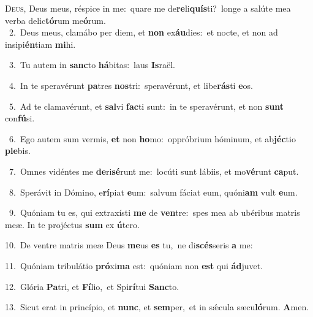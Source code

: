 \lettrine{\initial\textcolor{\initialcolor}{D}}{eus,} Deus meus, réspice in me:~\dagger quare me de\-\textbf{re}\-li\-\textbf{quís}\-ti?~\star longe a salúte mea verba delic\-\textbf{tó}\-rum me\-\textbf{ó}\-rum.\\
{\numbfont\textcolor{\numbcolor}{~2.}}~Deus meus, clamábo per diem, et \textbf{non} ex\-\textbf{áu}\-dies:~\star et nocte, et non ad insipi\-\textbf{én}\-tiam \textbf{mi}\-hi.\par
{\numbfont\textcolor{\numbcolor}{~3.}}~Tu autem in \textbf{sanc}\-to \textbf{há}\-bitas:~\star laus \textbf{Is}\-raël.\par
{\numbfont\textcolor{\numbcolor}{~4.}}~In te speravérunt \textbf{pa}\-tres \textbf{nos}\-tri:~\star speravérunt, et libe\-\textbf{rás}\-ti \textbf{e}\-os.\par
{\numbfont\textcolor{\numbcolor}{~5.}}~Ad te clamavérunt, et \textbf{sal}\-vi \textbf{fac}\-ti sunt:~\star in te speravérunt, et non \textbf{sunt} con\-\textbf{fú}\-si.\par
{\numbfont\textcolor{\numbcolor}{~6.}}~Ego autem sum vermis, \textbf{et} non \textbf{ho}\-mo:~\star oppróbrium hóminum, et ab\-\textbf{jéc}\-tio \textbf{ple}\-bis.\par
{\numbfont\textcolor{\numbcolor}{~7.}}~Omnes vidéntes me \textbf{de}\-ri\-\textbf{sé}\-runt me:~\star locúti sunt lábiis, et mo\-\textbf{vé}\-runt \textbf{ca}\-put.\par
{\numbfont\textcolor{\numbcolor}{~8.}}~Sperávit in Dómino, e\-\textbf{rí}\-piat \textbf{e}\-um:~\star salvum fáciat eum, quóni\textbf{am} vult \textbf{e}\-um.\par
{\numbfont\textcolor{\numbcolor}{~9.}}~Quóniam tu es, qui extraxísti \textbf{me} de \textbf{ven}\-tre:~\star spes mea ab ubéribus matris meæ. In te projéctus \textbf{sum} ex \textbf{ú}\-tero.\par
{\numbfont\textcolor{\numbcolor}{10.}}~De ventre matris meæ Deus \textbf{me}\-us \textbf{es} tu,~\star ne di\-\textbf{scés}\-seris \textbf{a} me:\par
{\numbfont\textcolor{\numbcolor}{11.}}~Quóniam tribulátio \textbf{pró}\-xi\textbf{ma} est:~\star quóniam non \textbf{est} qui \textbf{ád}\-juvet.\par
{\numbfont\textcolor{\numbcolor}{12.}}~Glória \textbf{Pa}\-tri, et \textbf{Fí}\-lio,~\star et Spi\-\textbf{rí}\-tui \textbf{Sanc}\-to.\par
{\numbfont\textcolor{\numbcolor}{13.}}~Sicut erat in princípio, et \textbf{nunc}\-, et \textbf{sem}\-per,~\star et in sǽcula sæcu\-\textbf{ló}\-rum. \textbf{A}\-men.\par
